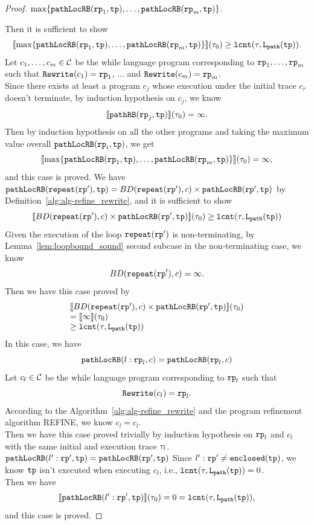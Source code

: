 \begin{proof}
 $\max\left\{ \outinB(\rprog_1, \tpath), \ldots, \outinB(\rprog_m, \tpath) \right\}$.

Then it is sufficient to show
\[
  \econfig{\max\left\{ \outinB(\rprog_1, \tpath), \ldots, \outinB(\rprog_m, \tpath) \right\}}(\trace_0) \geq \lcounter(\trace, \pathl(\tpath)).
\]
Let $c_1, \ldots, c_m \in \mathcal{C}$ be the while language program corresponding to $\mathtt{rp}_1, \ldots, \mathtt{rp}_m$ such that $\mathtt{Rewrite}(c_1) = \mathtt{rp}_1$, $\ldots$ and  $\mathtt{Rewrite}(c_m) = \mathtt{rp}_m$.
\\
Since there exists at least a program $c_j$ whose execution under the initial trace $c_r$ doesn't terminate, by induction hypothesis on $c_j$, we know 
\[
  \llbracket \mathtt{pathRB}(\mathtt{rp}_j, \mathtt{tp}) \rrbracket(\mathtt{\tau}_0) = \infty.
\]
Then by induction hypothesis on all the other programs and taking the maximum value overall $\mathtt{pathLocRB}(\mathtt{rp}_i, \mathtt{tp})$, we get
\[
  \econfig{\max\left\{ \outinB(\rprog_1, \tpath), \ldots, \outinB(\rprog_m, \tpath) \right\}}(\trace_0) = \infty,
\]
and this case is proved.
We have $\mathtt{pathLocRB}(\mathtt{repeat}(\mathtt{rp}'), \mathtt{tp}) = BD(\mathtt{repeat}(\mathtt{rp}'), c) \times \mathtt{pathLocRB}(\mathtt{rp}', \mathtt{tp})$
by Definition~\ref{alg:alg-refine_rewrite}, and
it is sufficient to show
\[
  \llbracket  BD(\mathtt{repeat}(\mathtt{rp}'), c) \times \mathtt{pathLocRB}(\mathtt{rp}', \mathtt{tp}) \rrbracket (\mathtt{\tau}_0) \geq \mathtt{lcnt}(\mathtt{\tau}, \mathtt{L}_{\mathtt{path}}(\mathtt{tp})) 
\]
Given the execution of the loop $\mathtt{repeat}(\mathtt{rp}')$ is non-terminating,
by Lemma~\ref{lem:loopbound_sound} second subcase in the non-terminating case, we know
\[
  BD(\mathtt{repeat}(\mathtt{rp}'), c) = \infty.
\]
Then we have this case proved by
\[
  \begin{array}{l}
  \llbracket BD(\mathtt{repeat}(\mathtt{rp}'), c) \times \mathtt{pathLocRB}(\mathtt{rp}', \mathtt{tp}) \rrbracket(\mathtt{\tau}_0) 
  \\
  =
  \llbracket  \infty  \rrbracket(\mathtt{\tau}_0) 
  \\
  \geq \mathtt{lcnt}(\mathtt{\tau}, \mathtt{L}_{\mathtt{path}}(\mathtt{tp})) 
  \end{array}
  \]
  In this case, we have
  \[
    \mathtt{pathLocRB}(l: \mathtt{rp}_l, c) = \mathtt{pathLocRB}(\mathtt{rp}_l, c)
  \]
  Let $c_l \in \mathcal{C}$ be the while language program corresponding to $\mathtt{rp}_l$ such that 
  $$\mathtt{Rewrite}(c_l) = \mathtt{rp}_l.$$
  According to the Algorithm~\ref{alg:alg-refine_rewrite} and the program refinement algorithm REFINE, we know
  $c_l = c_l$.
  \\
  Then we have this case proved trivially by induction hypothesis on $\mathtt{rp}_l$ and $c_l$ with the same initial and execution trace $\mathtt{\tau}_l$.
$\mathtt{pathLocRB}(l': \mathtt{rp}', \mathtt{tp}) = \mathtt{pathLocRB}(\mathtt{rp}', \mathtt{tp})$ 
Since $l': \mathtt{rp}' \neq \mathtt{enclosed}(\mathtt{tp})$, we know $\mathtt{tp}$ isn't executed when executing $c_l$, i.e., $\mathtt{lcnt}(\mathtt{\tau}, \mathtt{L}_{\mathtt{path}}(\mathtt{tp})) = 0$.
\\
Then we have
\[
  \llbracket \mathtt{pathLocRB}(l': \mathtt{rp}', \mathtt{tp}) \rrbracket(\mathtt{\tau}_0) = 0 = \mathtt{lcnt}(\mathtt{\tau}, \mathtt{L}_{\mathtt{path}}(\mathtt{tp})),
  \]
and this case is proved.
\end{proof}

